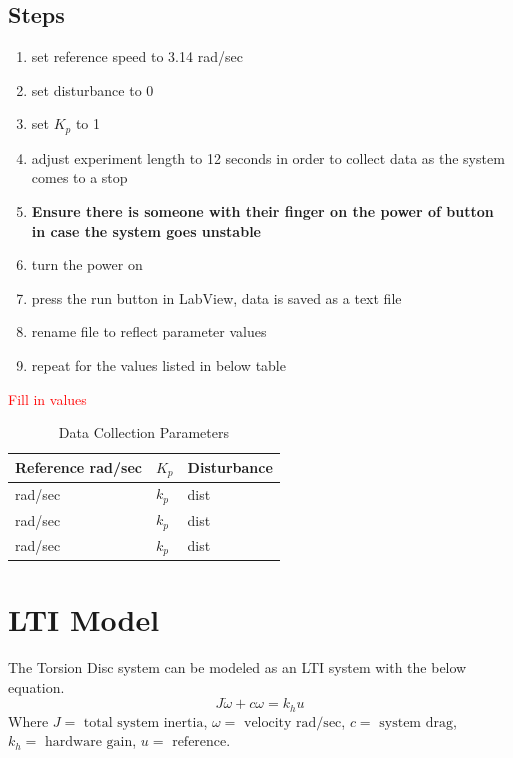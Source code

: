 \documentclass[11pt,titlepage]{article}
\begin{document}
	\subsection*{Steps}
		\begin{enumerate}
			\item set reference speed to 3.14 rad/sec
			\item set disturbance to 0
			\item set $K_p$ to 1
			\item adjust experiment length to 12 seconds in order to collect data as the system comes to a stop
			\item \textbf{Ensure there is someone with their finger on the power of button in case the system goes unstable}
			\item turn the power on
			\item press the run button in LabView, data is saved as a text file
			\item rename file to reflect parameter values
			\item repeat for the values listed in below table
		\end{enumerate}
		\textcolor{red}{Fill in values}
		\begin{table}[h!]
			\centering
			\begin{tabular}{|m{4cm}|m{3cm}|m{3cm}|} 
				\hline
				Reference rad/sec & $K_p$ & Disturbance \\ 
				\hline
				rad/sec & $k_p$ & dist\\
				\hline
				rad/sec & $k_p$ & dist\\
				\hline
				rad/sec & $k_p$ & dist \\
				\hline
			\end{tabular}
			\caption{Data Collection Parameters} \label{table:data_param}
		\end{table}

\section{LTI Model} \label{sec:LTI}
	The Torsion Disc system can be modeled as an LTI system with the below equation.
	\begin{equation} \label{eq:lti}
		J\dot{\omega}+c\omega=k_hu
	\end{equation}
	Where $J=\mbox{ total system inertia}$, $\omega=\mbox{ velocity rad/sec}$, $c=\mbox{ system drag}$, $k_h=\mbox{ hardware gain}$, $u=\mbox{ reference}$.
\end{document}
